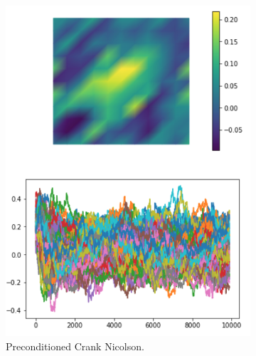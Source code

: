 \documentclass[9pt]{beamer}
\begin{document}
\begin{frame}
\begin{figure}
\begin{subfigure}{0.3\textwidth}
	\includegraphics[scale = 0.3]{MH_noObs.png}
	\caption{Preconditioned Crank Nicolson.}
\end{subfigure}
\hspace{0.6cm}
\begin{subfigure}{0.3\textwidth}

\end{subfigure}
\end{figure}
\end{frame}
\end{document}

